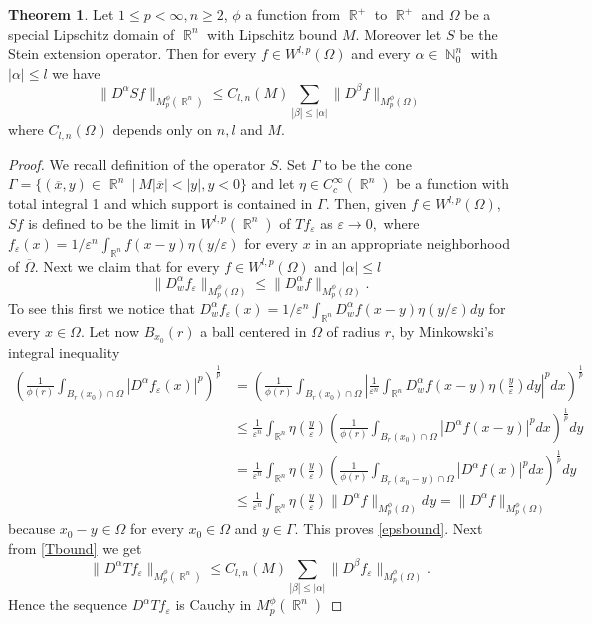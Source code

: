 \documentclass[12pt]{article}
\theoremstyle{definition}
\newtheorem{theorem}{Theorem}
\DeclareMathOperator\rr{\mathbb{R}}
\DeclareMathOperator\nn{\mathbb{N}}
\begin{document}
\begin{theorem}
Let $1\le p<\infty,n\ge2$, $\phi$ a function from $\rr^+$ to $\rr^+$ and $\Omega$ be a special Lipschitz domain of $\rr^n$ with Lipschitz bound $M.$ Moreover let $S$ be the Stein extension operator. Then for every $f \in W^{l,p}(\Omega)$ and every $\alpha \in \nn_0^n$ with $|\alpha|\le l$ we have
\begin{equation}
 \| D^\alpha Sf\|_{M_p^\phi(\rr^n)}\le C_{l,n}(M)\sum_{|\beta|\le |\alpha|}\|D^\beta f \|_{M_p^\phi(\Omega)} \label{Tbound}
 \end{equation}
 where $C_{l,n}(\Omega)$ depends only on $n,l$ and $M.$

 \begin{proof}
We recall definition of the operator $S.$ Set  $\Gamma$ to be the cone $\Gamma=\{(\overline x, y) \in \rr^n \ | \ M |\overline x|<|y|, y<0 \}$ and let $\eta \in C^\infty_c(\rr^n)$ be a function with total integral 1 and which support is contained in $\Gamma.$ Then, given $f \in W^{l,p}(\Omega)$, $Sf$ is defined to be the limit in $W^{l,p}(\rr^n)$ of $Tf_\varepsilon$ as $\varepsilon \to 0,$ where $f_\varepsilon(x)=1/\varepsilon^n \int_{\rr^n} f(x-y)\eta(y/\varepsilon)$ for every $x$ in an appropriate neighborhood of $	\overline \Omega$. Next we claim that for every $f \in W^{l,p}(\Omega)$ and $|\alpha|\le l$
\begin{equation}
\| D^\alpha_w f_\varepsilon\|_{M^\phi_p(\Omega)} \le \| D^\alpha_w f\|_{M^\phi_p(\Omega)} \label{epsbound}.
\end{equation}
To see this first we notice that $D^\alpha_w f_\varepsilon(x)=1/\varepsilon^n \int_{\rr^n} D^\alpha_w f(x-y)\eta(y/\varepsilon)dy$ for every $x \in \Omega.$ Let now $B_{x_0}(r)$ a ball centered in $\Omega$ of radius $r$, by Minkowski's integral inequality
\begin{align*}
 \left( \frac{1}{	\phi(r)} \int_{B_r(x_0)\cap \Omega} |D^\alpha f_\varepsilon (x)|^p \right)^{\frac{1}{p}} &= \left( \frac{1}{	\phi(r)} \int_{B_r(x_0)\cap \Omega} \left |\frac{1}{\varepsilon^n} \int_{\rr^n} D^\alpha_w f(x-y)\eta(\frac{y}{\varepsilon} )dy\right|^pdx \right)^{\frac{1}{p}} \\
 &\le \frac{1}{\varepsilon^n}  \int_{\rr^n} \eta(\frac{y}{\varepsilon} ) \left (\frac{1}{	\phi(r)}  \int_{B_r(x_0)\cap \Omega} |D^\alpha f(x-y)|^p dx\right)^{\frac{1}{p}}dy \\
 &=\frac{1}{\varepsilon^n}  \int_{\rr^n} \eta(\frac{y}{\varepsilon} ) \left (\frac{1}{	\phi(r)}  \int_{B_r(x_0-y)\cap \Omega} |D^\alpha f(x)|^p dx\right)^{\frac{1}{p}}dy \\
 & \le \frac{1}{\varepsilon^n}  \int_{\rr^n} \eta(\frac{y}{\varepsilon} ) \| D^\alpha f\|_{M_p^\phi(\Omega)} dy=\| D^\alpha f\|_{M_p^\phi(\Omega)}
\end{align*}
because $x_0-y \in \Omega$ for every $x_0 \in \Omega$ and $y \in \Gamma.$ This proves \eqref{epsbound}. Next from \eqref{Tbound} we get 
\[  \| D^\alpha Tf_\varepsilon\|_{M_p^\phi(\rr^n)}\le C_{l,n}(M)\sum_{|\beta|\le |\alpha|}\|D^\beta f_\varepsilon \|_{M_p^\phi(\Omega)} \label{Tbound}. \]
Hence the sequence $D^\alpha Tf_\varepsilon$ is Cauchy in $M_p^\phi(\rr^n)$
 \end{proof} 
\end{theorem}





\end{document}
